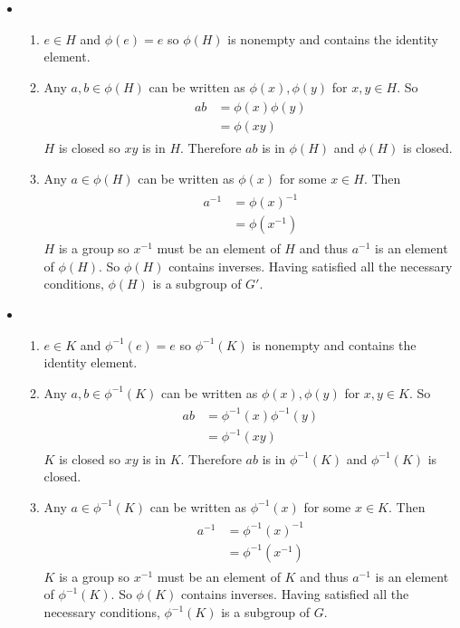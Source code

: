 \documentclass[paper=a4, fontsize=11pt]{jhwhw} %
\begin{document}
\solution
\begin{itemize}
\item
\begin{enumerate}
\item
$e \in H$ and $\phi(e) = e$ so $\phi(H)$ is nonempty and contains the identity element.
\item
Any $a,b\in \phi(H)$ can be written as $\phi(x),\phi(y)$ for $x,y \in H$. So
\begin{align}
\begin{split}
ab &= \phi(x)\phi(y)\\
&= \phi(xy)
\end{split}
\end{align}
$H$ is closed so $xy$ is in $H$. Therefore $ab$ is in $\phi(H)$ and $\phi(H)$ is closed.
\item
Any $a\in \phi(H)$ can be written as $\phi(x)$ for some $x\in H$. Then
\begin{align}
\begin{split}
a^{-1} &= \phi(x)^{-1}\\
&= \phi(x^{-1})
\end{split}
\end{align}
$H$ is a group so $x^{-1}$ must be an element of $H$ and thus $a^{-1}$ is an element of $\phi(H)$. So $\phi(H)$ contains inverses. 
Having satisfied all the necessary conditions, $\phi(H)$ is a subgroup of $G'$.
\end{enumerate}
\end{itemize}
\begin{itemize}
\item
\begin{enumerate}
\item
$e \in K$ and $\phi^{-1}(e) = e$ so $\phi^{-1}(K)$ is nonempty and contains the identity element.
\item
Any $a,b\in \phi^{-1}(K)$ can be written as $\phi(x),\phi(y)$ for $x,y \in K$. So
\begin{align}
\begin{split}
ab &= \phi^{-1}(x)\phi^{-1}(y)\\
&= \phi^{-1}(xy)
\end{split}
\end{align}
$K$ is closed so $xy$ is in $K$. Therefore $ab$ is in $\phi^{-1}(K)$ and $\phi^{-1}(K)$ is closed.
\item
Any $a\in \phi^{-1}(K)$ can be written as $\phi^{-1}(x)$ for some $x\in K$. Then
\begin{align}
\begin{split}
a^{-1} &= \phi^{-1}(x)^{-1}\\
&= \phi^{-1}(x^{-1})
\end{split} 
\end{align}
$K$ is a group so $x^{-1}$ must be an element of $K$ and thus $a^{-1}$ is an element of $\phi^{-1}(K)$. So $\phi(K)$ contains inverses. 
Having satisfied all the necessary conditions, $\phi^{-1}(K)$ is a subgroup of $G$.
\end{enumerate}
\end{itemize}
\end{document}
